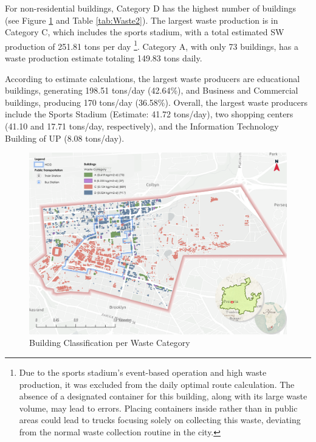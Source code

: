 \documentclass[authoryear,preprint,review,11pt,doubleblind]{elsarticle}
\begin{document}
    For non-residential buildings, Category D has the highest number of buildings (see Figure \ref{fig:buildWaste} and Table \ref{tab:Waste2}). The largest waste production is in Category C, which includes the sports stadium, with a total estimated SW production of 251.81 tons per day \footnote{Due to the sports stadium's event-based operation and high waste production, it was excluded from the daily optimal route calculation. The absence of a designated container for this building, along with its large waste volume, may lead to errors. Placing containers inside rather than in public areas could lead to trucks focusing solely on collecting this waste, deviating from the normal waste collection routine in the city.}. Category A, with only 73 buildings, has a waste production estimate totaling 149.83 tons daily.

    According to estimate calculations, the largest waste producers are educational buildings, generating 198.51 tons/day (42.64\%), and Business and Commercial buildings, producing 170 tons/day (36.58\%). Overall, the largest waste producers include the Sports Stadium (Estimate: 41.72 tons/day), two shopping centers (41.10 and 17.71 tons/day, respectively), and the Information Technology Building of UP (8.08 tons/day).
    
    \begin{figure}[ht]
    \centering
    \includegraphics[width=1.2\linewidth]{Figures/Waste Categories.png}
        \caption{Building Classification per Waste Category}
        \label{fig:buildWaste}
    \end{figure}
\end{document}
